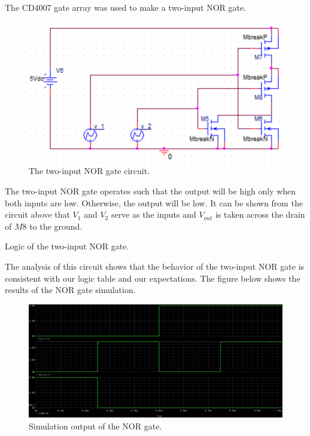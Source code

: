 
The CD4007 gate array was used to make a two-input NOR gate.


\FloatBarrier

\begin{figure}[h!]
\centering
\includegraphics[scale=0.5]{./images/nor_schematic.PNG}
\caption{The two-input NOR gate circuit.}
\label{fig:nor_schematic}
\end{figure}

\FloatBarrier

The two-input NOR gate operates such that the output will be high only when both inputs are low. Otherwise, the output will be low. It can be shown from the circuit above that $V_1$ and $V_2$ serve as the inputs and $V_{out}$ is taken across the drain of $M8$ to the ground.


\FloatBarrier

\begin{table}[h!]
\centering
{}
\caption{Logic of the two-input NOR gate.}
\label{tab:logic_nor.csv}
\end{table}

\FloatBarrier

The analysis of this circuit shows that the behavior of the two-input NOR gate is consistent with our logic table and our expectations. The figure below shows the results of the NOR gate simulation.

\FloatBarrier

\begin{figure}[h!]
\centering
\includegraphics[scale=0.3]{./images/nor_transient_output.PNG}
\caption{Simulation output of the NOR gate.}
\label{fig:nor_transient_output}
\end{figure}

